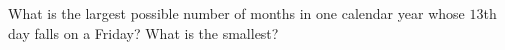 What is the largest possible number of months in one calendar year whose $13$th day falls on a Friday? What is the smallest?

